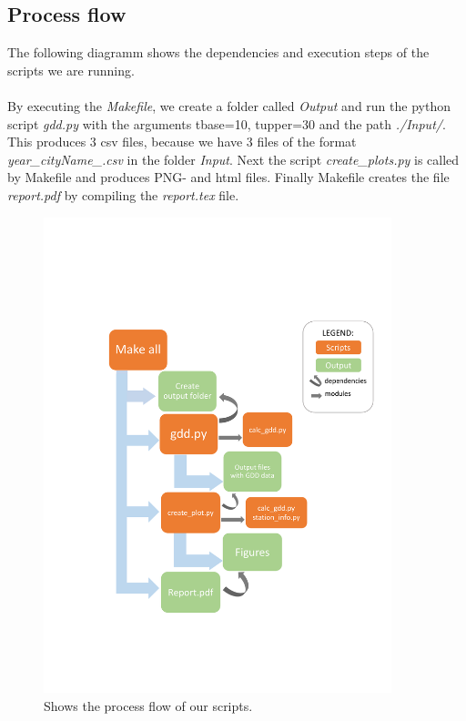 \documentclass[12pt]{article}
\begin{document}
\subsection{Process flow}
The following diagramm shows the dependencies and execution steps of the scripts
we are running.
\\~\\
By executing the \emph{Makefile}, we create a folder called \emph{Output} and run
the python script \emph{gdd.py} with the arguments tbase=10, tupper=30 and the path
 \emph{./Input/}. This produces 3 csv files, because we have 3 files of the 
format \emph{year\_cityName\_.csv} in the folder \emph{Input}.
Next the script \emph{create\_plots.py} is called by Makefile and produces  PNG- and html
files. Finally Makefile creates the file \emph{report.pdf} by compiling the 
\emph{report.tex} file.

	\begin{figure}[!htbp]
		\centering
		\includegraphics[width=0.9\textwidth]{./Report/diagram_workflow.pdf} 
		\caption{\scriptsize Shows the process flow of our scripts.}\label{flowplot}		  
	\end{figure}
\end{document}
